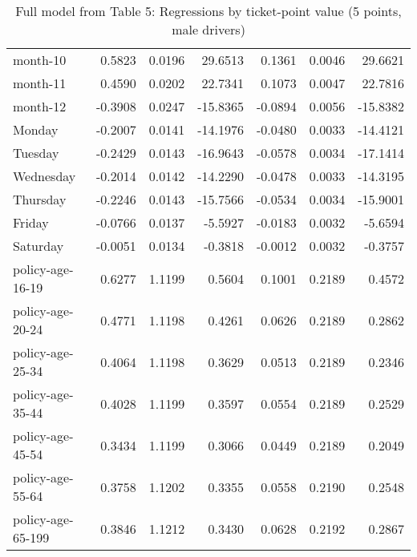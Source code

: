 \documentclass[10pt]{article}
\begin{document}
\begin{table}[ht]
\begin{tabular}{lrrrrrr}
  month-10 & 0.5823 & 0.0196 & 29.6513 & 0.1361 & 0.0046 & 29.6621 \\ 
  month-11 & 0.4590 & 0.0202 & 22.7341 & 0.1073 & 0.0047 & 22.7816 \\ 
  month-12 & -0.3908 & 0.0247 & -15.8365 & -0.0894 & 0.0056 & -15.8382 \\ 
  Monday & -0.2007 & 0.0141 & -14.1976 & -0.0480 & 0.0033 & -14.4121 \\ 
  Tuesday & -0.2429 & 0.0143 & -16.9643 & -0.0578 & 0.0034 & -17.1414 \\ 
  Wednesday & -0.2014 & 0.0142 & -14.2290 & -0.0478 & 0.0033 & -14.3195 \\ 
  Thursday & -0.2246 & 0.0143 & -15.7566 & -0.0534 & 0.0034 & -15.9001 \\ 
  Friday & -0.0766 & 0.0137 & -5.5927 & -0.0183 & 0.0032 & -5.6594 \\ 
  Saturday & -0.0051 & 0.0134 & -0.3818 & -0.0012 & 0.0032 & -0.3757 \\ 
  policy-age-16-19 & 0.6277 & 1.1199 & 0.5604 & 0.1001 & 0.2189 & 0.4572 \\ 
  policy-age-20-24 & 0.4771 & 1.1198 & 0.4261 & 0.0626 & 0.2189 & 0.2862 \\ 
  policy-age-25-34 & 0.4064 & 1.1198 & 0.3629 & 0.0513 & 0.2189 & 0.2346 \\ 
  policy-age-35-44 & 0.4028 & 1.1199 & 0.3597 & 0.0554 & 0.2189 & 0.2529 \\ 
  policy-age-45-54 & 0.3434 & 1.1199 & 0.3066 & 0.0449 & 0.2189 & 0.2049 \\ 
  policy-age-55-64 & 0.3758 & 1.1202 & 0.3355 & 0.0558 & 0.2190 & 0.2548 \\ 
  policy-age-65-199 & 0.3846 & 1.1212 & 0.3430 & 0.0628 & 0.2192 & 0.2867 \\ 
   \hline
\end{tabular}
\caption{Full model from Table 5: Regressions by ticket-point value (5 points, male drivers)} 
\label{tab_5_5_pts_M}
\end{table}


\clearpage
\pagebreak



\end{document}
